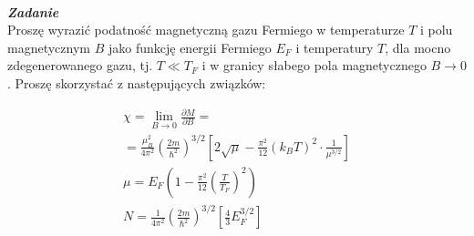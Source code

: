 \documentclass[11pt,a4paper]{article}
\newcounter{zadanie}\newcommand{\zadanie}[1][]{\addtocounter{zadanie}{1} ~\\ {\bf \emph{Zadanie \arabic{zadanie} #1 }} \\}
\begin{document}
\zadanie[]

Proszę wyrazić podatność magnetyczną gazu Fermiego w temperaturze $T$
i polu magnetycznym $B$ jako funkcję energii Fermiego $E_F$ i temperatury $T$,
dla mocno zdegenerowanego gazu, tj. $T \ll T_F$ i w granicy słabego pola magnetycznego 
$B \to 0$. Proszę skorzystać z następujących związków:

\begin{align*}
\chi = \lim_{B \to 0} \frac{\partial M}{\partial B} = \\
= \frac{\mu_B^2}{4\pi^{2}} \left( \frac{2m}{\hbar^2} \right)^{3/2} \left[
2 \sqrt{\mu} - \frac{\pi^2}{12} (k_B T)^2 \cdot \frac{1}{\mu^{3/2}} \right] \\
\mu = E_F \left( 1 - \frac{\pi^2}{12} \left( \frac{T}{T_F} \right)^2 \right) \\
N = \frac{1}{4\pi^{2}} \left( \frac{2m}{\hbar^2} \right)^{3/2} \left[
\frac{4}{3} E_F^{3/2}\right]
\end{align*}
\end{document}
